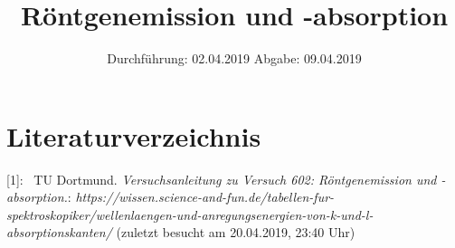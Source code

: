 

\subject{Nr. 602}
\title{Röntgenemission und -absorption}
\date{%
  Durchführung: 02.04.2019
  \hspace{3em}
  Abgabe: 09.04.2019
}



\maketitle
\thispagestyle{empty}
\tableofcontents
\newpage






\section{Literaturverzeichnis}

[1]: \ TU Dortmund. \textit{Versuchsanleitung zu Versuch 602:
Röntgenemission und -absorption.}\newline
[2]: \textit{https://wissen.science-and-fun.de/tabellen-fur-spektroskopiker/wellenlaengen-und-anregungsenergien-von-k-und-l-absorptionskanten/
} (zuletzt besucht am 20.04.2019, 23:40 Uhr)\newline


\printbibliography{}


